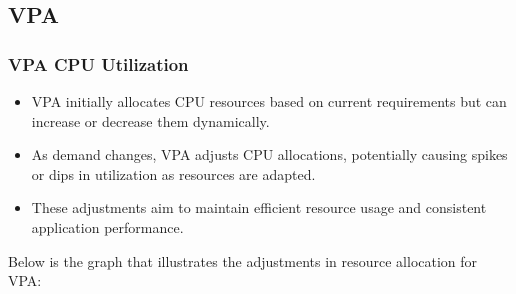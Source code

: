 \subsection{VPA}
\subsubsection{VPA CPU Utilization}
\begin{itemize}
    \item VPA initially allocates CPU resources based on current requirements but can increase or decrease them dynamically.
    \item As demand changes, VPA adjusts CPU allocations, potentially causing spikes or dips in utilization as resources are adapted.
    \item These adjustments aim to maintain efficient resource usage and consistent application performance.
\end{itemize}

\noindent Below is the graph that illustrates the adjustments in resource allocation for VPA:

